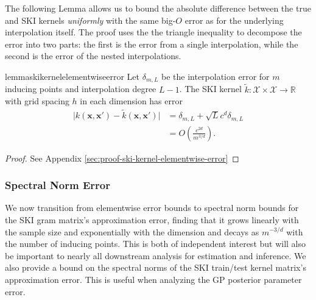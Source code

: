 The following Lemma allows us to bound the absolute difference between the true and SKI kernels \textit{uniformly} with the same big-$O$ error as for the underlying interpolation itself. The proof uses the the triangle inequality to decompose the error into two parts: the first is the error from a single interpolation, while the second is the error of the nested interpolations.


\begin{restatable}{lemma}{skikernelelementwiseerror}\label{lemma:ski-kernel-elementwise-error}
    Let $\delta_{m,L}$ be the interpolation error for $m$ inducing points and interpolation degree $L-1$. The SKI kernel $\tilde{k}:\mathcal{X}\times \mathcal{X}\rightarrow \mathbb{R}$ with grid spacing $h$ in each dimension has error
    \begin{align*}
        \vert k(\textbf{x},\textbf{x}')-\tilde{k}(\textbf{x},\textbf{x}')\vert&= \delta_{m,L}+\sqrt{L}c^d\delta_{m,L}\\
        &=O\left(\frac{c^{2d}}{m^{3/d}}\right).
    \end{align*}

\end{restatable}
\begin{proof}
    See Appendix \ref{sec:proof-ski-kernel-elementwise-error}
\end{proof}


\subsubsection{Spectral Norm Error}\label{subsubsec:spectral-norm-error}

We now transition from elementwise error bounds to spectral norm bounds for the SKI gram matrix's approximation error, finding that it grows linearly with the sample size and exponentially with the dimension and decays as $m^{-3/d}$ with the number of inducing points. This is both of independent interest but will also be important to nearly all downstream analysis for estimation and inference. We also provide a bound on the spectral norms of the SKI train/test kernel matrix's approximation error. This is useful when analyzing the GP posterior parameter error.%

